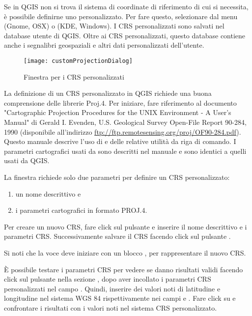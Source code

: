 Se in QGIS non si trova il sistema di coordinate di riferimento di cui si necessita, 
è possibile definirne uno personalizzato. Per fare questo, selezionare 
 dal menu  (Gnome, OSX) 
o  (KDE, Windows). 
I CRS personalizzati sono salvati nel database utente di QGIS. Oltre ai CRS personalizzati, 
questo database contiene anche i segnalibri geospaziali e altri dati personalizzati dell'utente.

\begin{figure}[ht]
   \centering
   \texttt{[image: customProjectionDialog]}
   \caption{Finestra per i CRS personalizzati \nixcaption}\label{fig:customprojections}
\end{figure}

La definizione di un CRS personalizzato in QGIS richiede una buona comprensione delle librerie
Proj.4. Per iniziare, fare riferimento al documento "Cartographic Projection Procedures for the UNIX Environment - A User's Manual" di Gerald I. Evenden, U.S. Geological Survey Open-File Report 90-284, 1990 
(disponibile all'indirizzo \url{ftp://ftp.remotesensing.org/proj/OF90-284.pdf}). 
Questo manuale descrive l'uso di  e delle relative utilità da riga di comando. 
I parametri cartografici usati da  sono descritti nel manuale e sono identici a quelli usati da QGIS.

La finestra  richiede solo due
parametri per definire un CRS personalizzato:
\begin{enumerate}
\item un nome descrittivo e
\item i parametri cartografici in formato PROJ.4.
\end{enumerate}
Per creare un nuovo CRS, fare click sul pulsante  e inserire 
il nome descrittivo e i parametri CRS. Successivamente salvare il CRS facendo click sul pulsante .

Si noti che la voce  deve iniziare con un blocco , per rappresentare il nuovo CRS.

È possibile testare i parametri CRS per vedere se danno risultati validi facendo click sul pulsante
 nella sezione , dopo aver incollato i parametri CRS personalizzati 
nel campo .
Quindi, inserire dei valori noti di latitudine e longitudine nel sistema WGS 84 rispettivamente nei campi  e . 
Fare click su  e confrontare i risultati con i valori noti nel sistema CRS personalizzato.

\FloatBarrier
